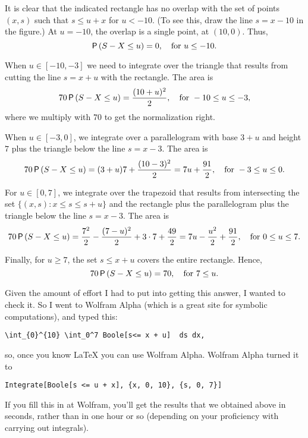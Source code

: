 \begin{exercise}
\begin{solution}
It is clear that  the indicated rectangle has no overlap with the set of points $(x,s)$ such that $s\leq u + x$ for $u<-10$. (To see this, draw the line $s=x-10$ in the figure.) At $u=-10$, the overlap is a single point, at $(10,0)$. Thus, 
\begin{equation*}
\P{S-X \leq u}=0, \quad \text{for } u\leq -10.
\end{equation*}

When $u\in[-10, -3]$ we need to integrate over the triangle that results from cutting the line $s=x+u$ with the rectangle. The area is 
\begin{equation*}
70\, \P{S-X \leq u}= \frac{(10+u)^2}2, \quad \text{for } -10 \leq u\leq -3,
\end{equation*}
where we multiply with $70$ to get the normalization right. 

When $u\in[-3, 0]$, we integrate over a parallelogram with base $3+u$ and height $7$ plus the triangle below the line $s=x-3$. The area is 
\begin{equation*}
70\, \P{S-X \leq u}= (3+u)7 + \frac{(10-3)^2}2=7u + \frac{91}2, \quad \text{for } -3 \leq u\leq 0.
\end{equation*}

For $u\in[0, 7]$, we integrate over the trapezoid that results from intersecting the set $\{(x,s) : x \leq s \leq s + u\}$ and the rectangle plus the parallelogram plus the triangle below the line $s=x-3$. The area is 
\begin{equation*}
70\, \P{S-X \leq u}=  \frac{7^2}2 - \frac{(7-u)^2}{2} + 3\cdot 7 + \frac{49}2 = 7 u - \frac{u^2}2 + \frac{91}2, \quad \text{for } 0\leq u\leq 7.
\end{equation*}

Finally, for $u\geq 7$, the set $s\leq x+u$ covers the entire rectangle. Hence, 
\begin{equation*}
70\, \P{S-X \leq u}=  70, \quad \text{for } 7\leq u.
\end{equation*}

Given the amount of effort I had to put into getting this answer, I wanted to check it. So I went to  Wolfram Alpha (which is a great site for symbolic computations), and typed this: 
\begin{verbatim}
\int_{0}^{10} \int_0^7 Boole[s<= x + u]  ds dx,
\end{verbatim}
so, once you know \LaTeX\/ you can use Wolfram Alpha.  Wolfram Alpha turned it to 
\begin{verbatim}
Integrate[Boole[s <= u + x], {x, 0, 10}, {s, 0, 7}]
\end{verbatim}
If you fill this in at Wolfram, you'll get the results that we obtained above in seconds, rather than in one hour or so (depending on your proficiency with carrying out integrals).
\end{solution}
\end{exercise}

